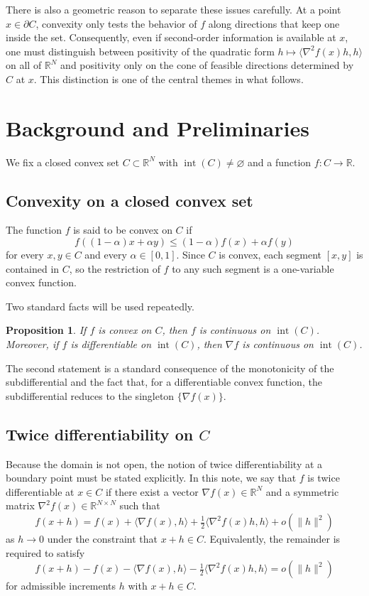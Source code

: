 \documentclass[11pt]{article}
\newtheorem{proposition}{Proposition}
\theoremstyle{remark}
\newcommand{\R}{\mathbb{R}}
\newcommand{\inner}[2]{\langle #1,#2\rangle}
\begin{document}
There is also a geometric reason to separate these issues carefully. At a point
$x \in \partial C$, convexity only tests the behavior of $f$ along directions
that keep one inside the set. Consequently, even if second-order information is
available at $x$, one must distinguish between positivity of the quadratic form
$h \mapsto \inner{\nabla^2 f(x) h}{h}$ on all of $\R^N$ and positivity only on
the cone of feasible directions determined by $C$ at $x$. This distinction is
one of the central themes in what follows.

\section{Background and Preliminaries}

We fix a closed convex set $C \subset \R^N$ with $\operatorname{int}(C)
\neq \varnothing$ and a function $f \colon C \to \R$.

\subsection{Convexity on a closed convex set}

The function $f$ is said to be convex on $C$ if
\[
f((1-\alpha)x+\alpha y) \leq (1-\alpha)f(x)+\alpha f(y)
\]
for every $x,y \in C$ and every $\alpha \in [0,1]$. Since $C$ is convex, each
segment $[x,y]$ is contained in $C$, so the restriction of $f$ to any such
segment is a one-variable convex function.

Two standard facts will be used repeatedly.

\begin{proposition}
If $f$ is convex on $C$, then $f$ is continuous on $\operatorname{int}(C)$.
Moreover, if $f$ is differentiable on $\operatorname{int}(C)$, then
$\nabla f$ is continuous on $\operatorname{int}(C)$.
\end{proposition}

The second statement is a standard consequence of the monotonicity of the
subdifferential and the fact that, for a differentiable convex function, the
subdifferential reduces to the singleton $\{\nabla f(x)\}$.

\subsection{Twice differentiability on $C$}

Because the domain is not open, the notion of twice differentiability at a
boundary point must be stated explicitly. In this note, we say that $f$ is
twice differentiable at $x \in C$ if there exist a vector $\nabla f(x) \in \R^N$
and a symmetric matrix $\nabla^2 f(x) \in \R^{N \times N}$ such that
\[
f(x+h)=f(x)+\inner{\nabla f(x)}{h}
+\tfrac12 \inner{\nabla^2 f(x)h}{h}+o(\|h\|^2)
\]
as $h \to 0$ under the constraint that $x+h \in C$. Equivalently, the remainder
is required to satisfy
\[
f(x+h)-f(x)-\inner{\nabla f(x)}{h}-\tfrac12 \inner{\nabla^2 f(x)h}{h}
=o(\|h\|^2)
\]
for admissible increments $h$ with $x+h \in C$.
\end{document}
